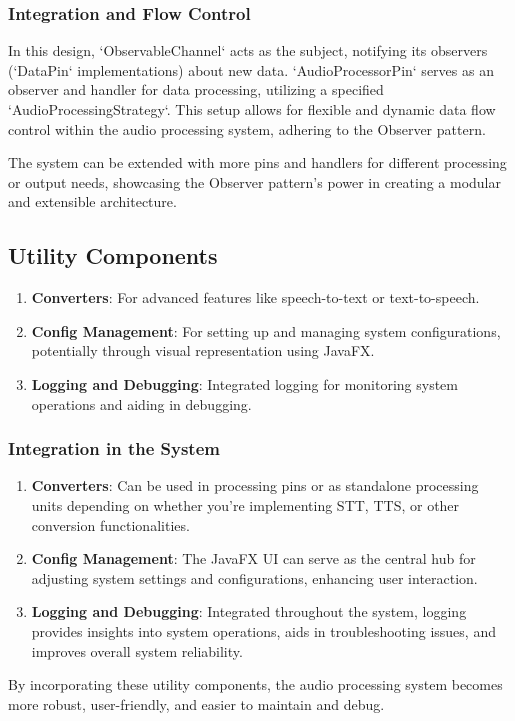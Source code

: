 \documentclass[a4paper,12pt]{article}
\begin{document}
\subsubsection*{Integration and Flow Control}
In this design, `ObservableChannel` acts as the subject, notifying its observers
(`DataPin` implementations) about new data.
`AudioProcessorPin` serves as an observer and handler for data processing,
utilizing a specified `AudioProcessingStrategy`.
This setup allows for flexible and dynamic data flow control within the audio processing system,
adhering to the Observer pattern.

The system can be extended with more pins and handlers for different processing or output needs,
showcasing the Observer pattern's power in creating a modular and extensible architecture.

\subsection{Utility Components}
\begin{enumerate}
  \item \textbf{Converters}: For advanced features like speech-to-text or text-to-speech.
  \item \textbf{Config Management}: For setting up and managing system configurations,
  potentially through visual representation using JavaFX.
  \item \textbf{Logging and Debugging}: Integrated logging for monitoring system operations
  and aiding in debugging.
\end{enumerate}

\subsubsection*{Integration in the System}
\begin{enumerate}
  \item \textbf{Converters}: Can be used in processing pins or as standalone processing units
  depending on whether you're implementing STT, TTS, or other conversion functionalities.
  \item \textbf{Config Management}: The JavaFX UI can serve as the central hub
  for adjusting system settings and configurations, enhancing user interaction.
  \item \textbf{Logging and Debugging}: Integrated throughout the system,
  logging provides insights into system operations, aids in troubleshooting issues,
  and improves overall system reliability.
\end{enumerate}
By incorporating these utility components, the audio processing system becomes more robust,
user-friendly, and easier to maintain and debug.
\end{document}
